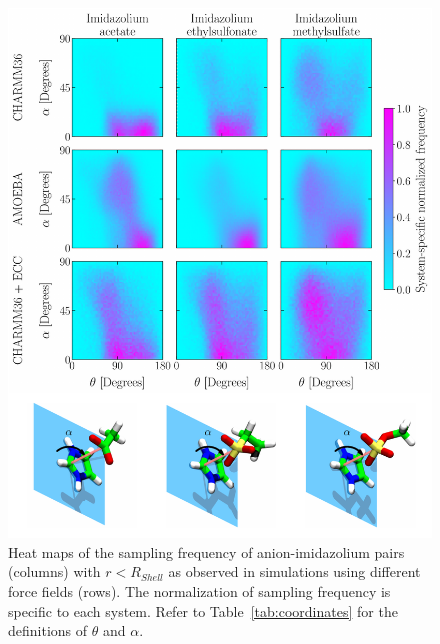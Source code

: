 \documentclass[journal=jacsat,articletitle=true,manuscript=suppinfo,layout=onecolumn]{achemso}
\begin{document}
    \begin{figure}[H]
    \begin{center}
        \includegraphics[width=\columnwidth]{images/fig_hexmaps_imim.pdf}
        \caption{Heat maps of the sampling frequency of anion-imidazolium pairs (columns) with $r < R_{Shell}$ as observed in simulations using different force fields (rows). The normalization of sampling frequency is specific to each system. Refer to Table~\ref{tab:coordinates} for the definitions of $\theta$ and $\alpha$.}
        \label{fig:heatmap_imim}
    \end{center}
    \end{figure}
\end{document}
